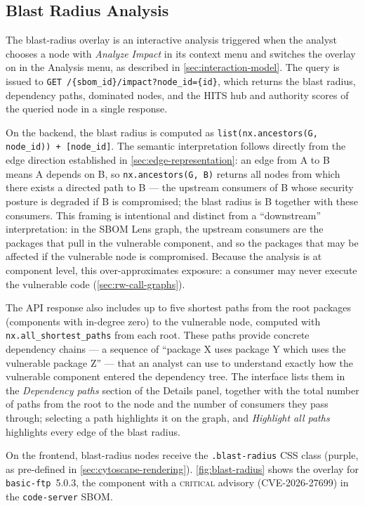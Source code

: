 \subsection{Blast Radius Analysis}
\label{sec:blast-radius}

The blast-radius overlay is an interactive analysis triggered when the analyst chooses a node with \emph{Analyze Impact} in its context menu and switches the overlay on in the Analysis menu, as described in \autoref{sec:interaction-model}. The query is issued to \texttt{GET /\{sbom\_id\}/impact?node\_id=\{id\}}, which returns the blast radius, dependency paths, dominated nodes, and the HITS hub and authority scores of the queried node in a single response.

On the backend, the blast radius is computed as \texttt{list(nx.ancestors(G, node\_id)) + [node\_id]}. The semantic interpretation follows directly from the edge direction established in \autoref{sec:edge-representation}: an edge from A to B means A depends on B, so \texttt{nx.ancestors(G, B)} returns all nodes from which there exists a directed path to B --- the upstream consumers of B whose security posture is degraded if B is compromised; the blast radius is B together with these consumers. This framing is intentional and distinct from a ``downstream'' interpretation: in the SBOM Lens graph, the upstream consumers are the packages that pull in the vulnerable component, and so the packages that may be affected if the vulnerable node is compromised. Because the analysis is at component level, this over-approximates exposure: a consumer may never execute the vulnerable code (\autoref{sec:rw-call-graphs}).

The API response also includes up to five shortest paths from the root packages (components with in-degree zero) to the vulnerable node, computed with \texttt{nx.all\_shortest\_paths} from each root. These paths provide concrete dependency chains --- a sequence of ``package X uses package Y which uses the vulnerable package Z'' --- that an analyst can use to understand exactly how the vulnerable component entered the dependency tree. The interface lists them in the \emph{Dependency paths} section of the Details panel, together with the total number of paths from the root to the node and the number of consumers they pass through; selecting a path highlights it on the graph, and \emph{Highlight all paths} highlights every edge of the blast radius.

On the frontend, blast-radius nodes receive the \texttt{.blast-radius} CSS class (purple, as pre-defined in \autoref{sec:cytoscape-rendering}). \autoref{fig:blast-radius} shows the overlay for \texttt{basic-ftp}~5.0.3, the component with a \textsc{critical} advisory (CVE-2026-27699) in the \texttt{code-server} SBOM.

